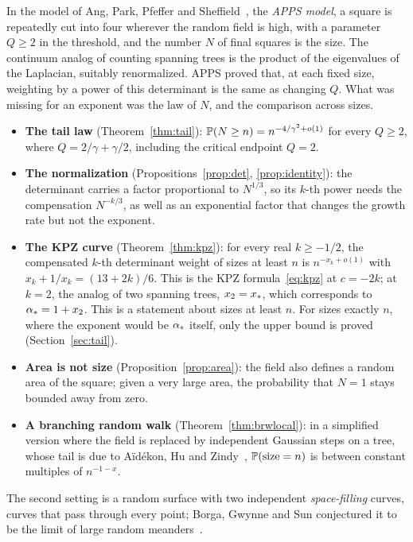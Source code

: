 In the model of Ang, Park, Pfeffer and Sheffield~\cite{APPS}, the \emph{APPS model}, a square is
repeatedly cut into four wherever the random field is high, with a parameter $Q\ge2$ in the
threshold, and the number $N$ of final squares is the size. The continuum analog of counting
spanning trees is the product of the eigenvalues of the Laplacian, suitably renormalized. APPS
proved that, at each fixed size, weighting by a power of this determinant is the same as changing
$Q$. What was missing for an exponent was the law of $N$, and the comparison across sizes.
\begin{itemize}
\item \textbf{The tail law} (Theorem~\ref{thm:tail}): $\mathbb{P}(N\ge n)=n^{-4/\gamma^2+o(1)}$ for every
$Q\ge2$, where $Q=2/\gamma+\gamma/2$, including the critical endpoint $Q=2$.
\item \textbf{The normalization} (Propositions~\ref{prop:det}, \ref{prop:identity}): the determinant
carries a factor proportional to $N^{1/3}$, so its $k$-th power needs the compensation $N^{-k/3}$, as
well as an exponential factor that changes the growth rate but not the exponent.
\item \textbf{The KPZ curve} (Theorem~\ref{thm:kpz}): for every real $k\ge-1/2$, the compensated
$k$-th determinant weight of sizes at least $n$ is $n^{-x_k+o(1)}$ with $x_k+1/x_k=(13+2k)/6$. This
is the KPZ formula~\eqref{eq:kpz} at $c=-2k$; at $k=2$, the analog of two spanning trees,
$x_2=x_*$, which corresponds to $\alpha_*=1+x_2$. This is a statement about sizes at least $n$. For sizes
exactly $n$, where the exponent would be $\alpha_*$ itself, only the upper bound is proved (Section~\ref{sec:tail}).
\item \textbf{Area is not size} (Proposition~\ref{prop:area}): the field also defines a random area
of the square; given a very large area, the probability that $N=1$ stays bounded away from zero.
\item \textbf{A branching random walk} (Theorem~\ref{thm:brwlocal}): in a simplified version where
the field is replaced by independent Gaussian steps on a tree, whose tail is due to A\"id\'ekon, Hu
and Zindy~\cite{AHZ}, $\mathbb{P}(\text{size}=n)$ is between constant multiples of $n^{-1-x}$.
\end{itemize}
The second setting is a random surface with two independent \emph{space-filling} curves, curves
that pass through every point; Borga, Gwynne and Sun conjectured it to be the limit of large random
meanders~\cite{BGS}.

